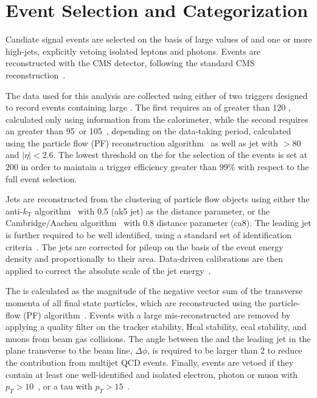 \section{Event Selection and Categorization}\label{sec:selection}

Candiate signal events are selected on the basis of large values of \ETm and one or more high-\pt jets, 
explicitly vetoing isolated leptons and photons. Events are
reconstructed with the CMS detector, following the standard CMS reconstruction~\cite{CMSdetector}. 

The data used for this analysis are collected using either of two triggers designed to record events containing large \ETm. The first requires an \ETm of greater than 120 \gev, calculated only using information from the calorimeter, 
while the second requires an \ETm greater than 95~\gev or 105~\gev, depending on the data-taking period, calculated using  
the particle flow (PF) reconstruction algorithm~\cite{CMS-PAS-PFT-09-001} as well as jet with \pt$>80$ \gev and $|\eta|<2.6$. 
The lowest threshold on the \ETm for the selection of the events is set at 200 \gev in order to maintain a trigger efficiency greater than 
$99$\% with respect to the full event selection. 

Jets are reconstructed from the clustering of particle flow objects using either the 
anti-$k_{\textrm{T}}$ algorithm~\cite{Cacciari:2008gp} with 0.5 (ak5 jet) as the distance parameter,  
or the Cambridge/Aachen algorithm~\cite{cajets} with 0.8 distance
parameter (ca8). The leading jet is further required to be well
identified, using a standard set of identification criteria~\cite{jec}. The jets are corrected for pileup on the basis of the event energy density and 
proportionally to their area. Data-driven calibrations are then applied to correct the absolute scale of the jet energy~\cite{jec}.

The \ETm is calculated as the magnitude of the negative 
vector sum of the transverse momenta of all final state particles, which are reconstructed 
using the particle-flow (PF) algorithm~\cite{CMS-PAS-PFT-09-001}.
Events with a large mis-reconstructed \ETm are removed by applying a
quality filter on the tracker stability, Hcal stability, ecal
stability, and muons from beam gas collisions. 
The angle between the \ETm and the leading jet in the plane transverse to the beam line, $\Delta\phi$, is required to be larger than 2 to reduce the contribution from multijet QCD events. 
Finally, events are vetoed if they contain at least one well-identified and isolated electron, photon or muon with $p_T>10$~\gev, or a tau with $p_T>15$~\gev.

